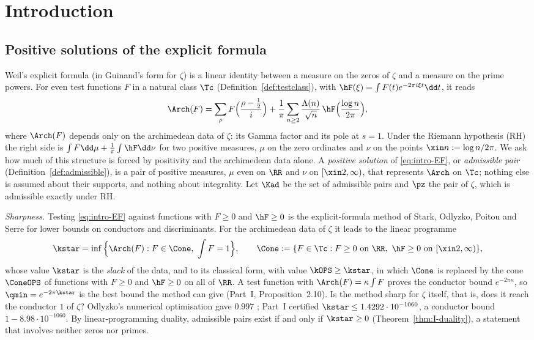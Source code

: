 \section{Introduction}\label{sec:intro}

\subsection{Positive solutions of the explicit formula}

Weil's explicit formula \cite{Wei52} (in Guinand's form \cite{Gui48} for $\zeta$) is a linear identity between a measure on the zeros of $\zeta$
and a measure on the prime powers. For even test functions $F$ in a natural class $\Tc$ (Definition~\ref{def:testclass}), with
$\hF(\xi)=\int F(t)e^{-2\pi i\xi t}\dd t$, it reads
\begin{equation}\label{eq:intro-EF}
\Arch(F)=\sum_\rho F\Big(\frac{\rho-\frac12}i\Big)+\frac1\pi\sum_{n\ge2}\frac{\Lambda(n)}{\sqrt n}\,\hF\Big(\frac{\log n}{2\pi}\Big),
\end{equation}
where $\Arch(F)$ depends only on the archimedean data of $\zeta$: its Gamma factor and its pole at $s=1$. Under the Riemann hypothesis (RH)
the right side is $\int F\dd\mu+\frac1\pi\int\hF\dd\nu$ for two positive measures, $\mu$ on the zero ordinates and $\nu$ on the points
$\xin n:=\log n/2\pi$. We ask how much of this structure is forced by positivity and the archimedean data alone. A \emph{positive solution}
of \eqref{eq:intro-EF}, or \emph{admissible pair} (Definition~\ref{def:admissible}), is a pair of positive measures, $\mu$ even on $\RR$ and
$\nu$ on $[\xin2,\infty)$, that represents $\Arch$ on $\Tc$; nothing else is assumed about their supports, and nothing about integrality.
Let $\Kad$ be the set of admissible pairs and $\pz$ the pair of $\zeta$, which is admissible exactly under RH.

\emph{Sharpness.} Testing \eqref{eq:intro-EF} against functions with $F\ge0$ and $\hF\ge0$ is the explicit-formula method of Stark, Odlyzko,
Poitou and Serre \cite{Sta74,Odl76,Ser75,Poi77,Odl90} for lower bounds on conductors and discriminants. For the archimedean data of $\zeta$ it
leads to the linear programme
\[
\kstar=\inf\Big\{\Arch(F):F\in\Cone,\ \int F=1\Big\},\qquad \Cone:=\{F\in\Tc:F\ge0\text{ on }\RR,\ \hF\ge0\text{ on }[\xin2,\infty)\},
\]
whose value $\kstar$ is the \emph{slack} of the data, and to its classical form, with value $\kOPS\ge\kstar$, in which $\Cone$ is replaced by
the cone $\ConeOPS$ of functions with $F\ge0$ and $\hF\ge0$ on all of $\RR$. A test function with $\Arch(F)=\kappa\int F$ proves the conductor
bound $e^{-2\pi\kappa}$, so $\qmin=e^{-2\pi\kstar}$ is the best bound the method can give (Part~I, Proposition~2.10). Is the method sharp for
$\zeta$ itself, that is, does it reach the conductor $1$ of $\zeta$? Odlyzko's numerical optimisation gave $0.997$ \cite[Table~4]{Odl90};
Part~I certified $\kstar\le1.4292\cdot10^{-1060}$, a conductor bound $1-8.98\cdot10^{-1060}$. By linear-programming duality, admissible pairs
exist if and only if $\kstar\ge0$ (Theorem~\ref{thm:I-duality}), a statement that involves neither zeros nor primes.

